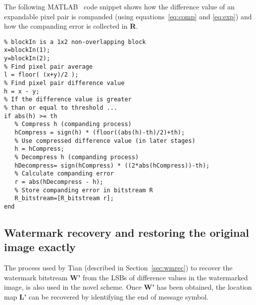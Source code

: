 \documentclass[10pt,twocolumn,letterpaper]{article}
\begin{document}
{The following MATLAB~\cite{matlab2} code snippet shows how the difference value of an expandable pixel pair 
is companded (using equations~\ref{eq:comp} and \ref{eq:exp}) and how the companding error is collected in {\bf R}.

\begin{scriptsize}
\begin{verbatim}
% blockIn is a 1x2 non-overlapping block
x=blockIn(1);           
y=blockIn(2);
% Find pixel pair average
l = floor( (x+y)/2 );   
% Find pixel pair difference value
h = x - y;              
% If the difference value is greater 
% than or equal to threshold ...
if abs(h) >= th
   % Compress h (companding process)
   hCompress = sign(h) * (floor((abs(h)-th)/2)+th);       
   % Use compressed difference value (in later stages)
   h = hCompress;
   % Decompress h (companding process)
   hDecompress= sign(hCompress) * ((2*abs(hCompress))-th);   
   % Calculate companding error
   r = abs(hDecompress - h);                                  
   % Store companding error in bitstream R
   R_bitstream=[R_bitstream r];                           
end
\end{verbatim}
\end{scriptsize}

\subsection{Watermark recovery and restoring the original image exactly}
\label{sec:restoreNovel}
The process used by Tian (described in 
Section~\ref{sec:wmrec}) to recover the watermark bitstream {\bf W'}
from the LSBs of difference values in the watermarked image, 
is also used in the novel scheme.
Once {\bf W'} has been obtained, the location map {\bf L'} can be recovered by identifying the
end of message symbol. 

}
\end{document}
